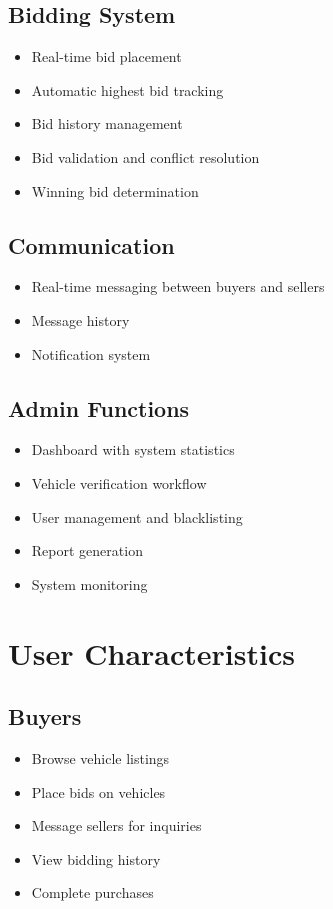 \documentclass[12pt,a4paper]{report}
\begin{document}
\subsection{Bidding System}
\begin{itemize}
    \item Real-time bid placement
    \item Automatic highest bid tracking
    \item Bid history management
    \item Bid validation and conflict resolution
    \item Winning bid determination
\end{itemize}

\subsection{Communication}
\begin{itemize}
    \item Real-time messaging between buyers and sellers
    \item Message history
    \item Notification system
\end{itemize}

\subsection{Admin Functions}
\begin{itemize}
    \item Dashboard with system statistics
    \item Vehicle verification workflow
    \item User management and blacklisting
    \item Report generation
    \item System monitoring
\end{itemize}

\section{User Characteristics}
\subsection{Buyers}
\begin{itemize}
    \item Browse vehicle listings
    \item Place bids on vehicles
    \item Message sellers for inquiries
    \item View bidding history
    \item Complete purchases
\end{itemize}
\end{document}
